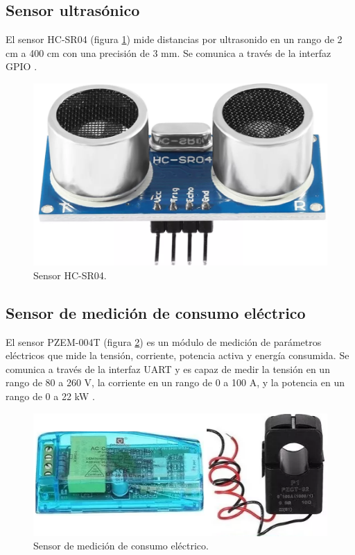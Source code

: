 
\subsection{Sensor ultrasónico}

El sensor HC-SR04 (figura \ref{fig:HC-SR04}) mide distancias por ultrasonido en
un rango de 2 cm a 400 cm con una precisión de 3 mm. Se comunica a través de la
interfaz GPIO \cite{HC-SR04}.

\begin{figure}[H]
	\centering
	\includegraphics[height=.15\textwidth]{./Images/11.png}
	\caption{Sensor HC-SR04\protect\footnotemark.}
	\label{fig:HC-SR04}
\end{figure}


\subsection{Sensor de medición de consumo eléctrico}

El sensor PZEM-004T (figura \ref{fig:PZEM-004T}) es un módulo de medición de
parámetros eléctricos que mide la tensión, corriente, potencia activa y energía
consumida. Se comunica a través de la interfaz UART y es capaz de medir la
tensión en un rango de 80 a 260 V, la corriente en un rango de 0 a 100 A, y la
potencia en un rango de 0 a 22 kW \cite{PZEM-004T}.

\begin{figure}[H]
	\centering
	\includegraphics[height=.15\textwidth]{./Images/12.png}
	\caption{Sensor de medición de consumo eléctrico\protect\footnotemark.}
	\label{fig:PZEM-004T}
\end{figure}

